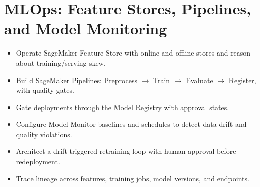 \chapter{MLOps: Feature Stores, Pipelines, and Model Monitoring}
%
\begin{objectives}
\begin{itemize}
    \item Operate SageMaker Feature Store with online and offline stores and reason about training/serving skew.
    \item Build SageMaker Pipelines: Preprocess $\rightarrow$ Train $\rightarrow$ Evaluate $\rightarrow$ Register, with quality gates.
    \item Gate deployments through the Model Registry with approval states.
    \item Configure Model Monitor baselines and schedules to detect data drift and quality violations.
    \item Architect a drift-triggered retraining loop with human approval before redeployment.
    \item Trace lineage across features, training jobs, model versions, and endpoints.
\end{itemize}
\end{objectives}

